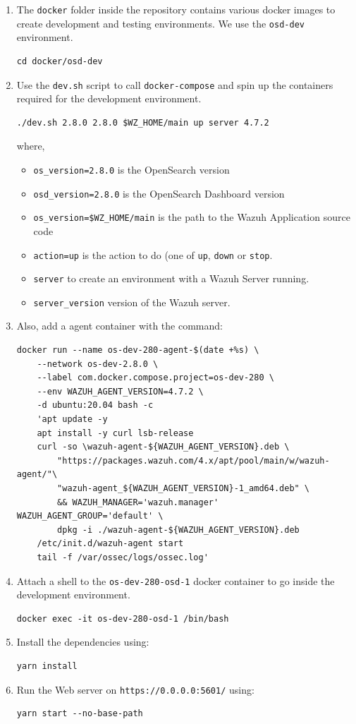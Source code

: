 \begin{enumerate}
    \item The \texttt{docker} folder inside the repository contains various docker images to create development and testing environments. We use the \texttt{osd-dev} environment.
    \begin{verbatim}
cd docker/osd-dev
    \end{verbatim}
    \item Use the \texttt{dev.sh} script to call \texttt{docker-compose} and spin up the containers required for the development environment.
    \begin{verbatim}
./dev.sh 2.8.0 2.8.0 $WZ_HOME/main up server 4.7.2
    \end{verbatim}
    where, 
    \begin{itemize}
        \item \texttt{os\_version=2.8.0} is the OpenSearch version
        \item \texttt{osd\_version=2.8.0} is the OpenSearch Dashboard version
        \item \texttt{os\_version=\$WZ\_HOME/main} is the path to the Wazuh Application source code
        \item \texttt{action=up} is the action to do (one of \texttt{up}, \texttt{down} or \texttt{stop}.
        \item \texttt{server} to create an environment with a Wazuh Server running.
        \item \texttt{server\_version} version of the Wazuh server.
    \end{itemize}
    \item Also, add a agent container with the command:
    \begin{verbatim}
docker run --name os-dev-280-agent-$(date +%s) \
    --network os-dev-2.8.0 \
    --label com.docker.compose.project=os-dev-280 \
    --env WAZUH_AGENT_VERSION=4.7.2 \
    -d ubuntu:20.04 bash -c 
    'apt update -y
    apt install -y curl lsb-release
    curl -so \wazuh-agent-${WAZUH_AGENT_VERSION}.deb \
        "https://packages.wazuh.com/4.x/apt/pool/main/w/wazuh-agent/"\
        "wazuh-agent_${WAZUH_AGENT_VERSION}-1_amd64.deb" \
        && WAZUH_MANAGER='wazuh.manager' WAZUH_AGENT_GROUP='default' \
        dpkg -i ./wazuh-agent-${WAZUH_AGENT_VERSION}.deb
    /etc/init.d/wazuh-agent start
    tail -f /var/ossec/logs/ossec.log'
    \end{verbatim}
    \item Attach a shell to the \texttt{os-dev-280-osd-1} docker container to go inside the development environment.
    \begin{verbatim}
docker exec -it os-dev-280-osd-1 /bin/bash
    \end{verbatim}
    \item Install the dependencies using:
    \begin{verbatim}
yarn install 
    \end{verbatim}
    \item Run the Web server on \texttt{https://0.0.0.0:5601/} using:
    \begin{verbatim}
yarn start --no-base-path 
    \end{verbatim}
\end{enumerate}
